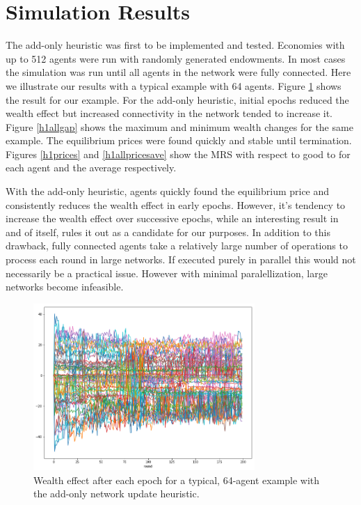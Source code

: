 \documentclass[smallextended]{svjour3}
\begin{document}
\section{Simulation Results}
The add-only heuristic was first to be implemented and tested. Economies with up
to 512 agents were run with randomly generated endowments. In most cases the
simulation was run until all agents in the network were fully connected.
Here we illustrate our results with a typical example with 64 agents.
Figure \ref{h1start} shows the result for our example.
For the add-only heuristic, initial epochs reduced the wealth effect but
increased connectivity in the network tended to increase it. Figure
\ref{h1allgap} shows the maximum and minimum wealth changes for the same example.
The equilibrium prices were found quickly and stable until termination.
Figures \ref{h1prices} and \ref{h1allpricesave} show the MRS with respect to
good to for each agent and the average respectively.

With the add-only heuristic, agents quickly found the equilibrium price and
consistently reduces the wealth effect in early epochs. However, it's tendency
to increase the wealth effect over successive epochs, while an interesting
result in and of itself, rules it out as a candidate for our purposes.
In addition to this drawback, fully connected agents take a relatively large
number of operations to process each round in large networks. If executed purely
in parallel this would not necessarily be a practical issue. However with
minimal paralellization, large networks become infeasible.

\begin{figure}
  \includegraphics[width=0.75\textwidth]{h1startwealth.png}
  \caption{Wealth effect after each epoch for a typical, 64-agent example with the add-only
    network update heuristic. }
  \label{h1start}
\end{figure}
\end{document}
